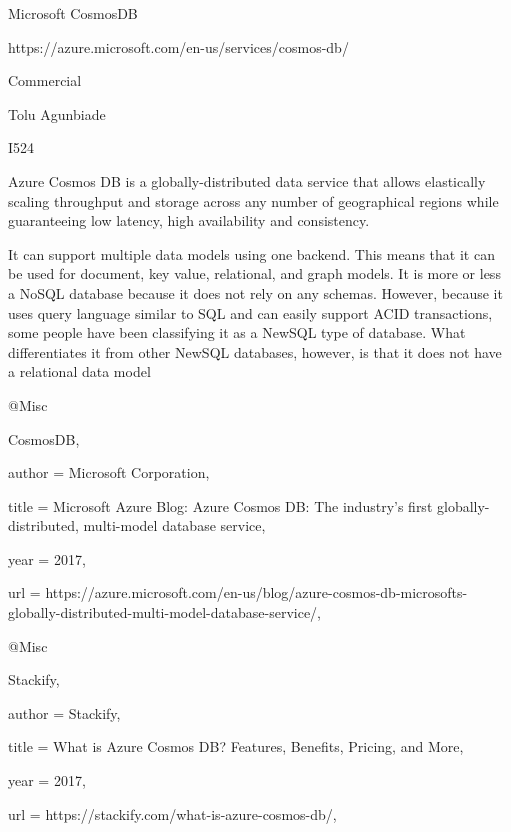 Microsoft CosmosDB

https://azure.microsoft.com/en-us/services/cosmos-db/

Commercial

Tolu Agunbiade

I524

Azure Cosmos DB is a globally-distributed data service that allows elastically scaling throughput and storage across any number of geographical regions while guaranteeing low latency, high availability and consistency\cite{hid-sp18-501-CosmosDB}.

It can support multiple data models using one backend. This means that it can be used for document, key value, relational, and graph models. It is more or less a NoSQL database because it does not rely on any schemas. However, because it uses query language similar to SQL and can easily support ACID transactions, some people have been classifying it as a NewSQL type of database. What differentiates it from other NewSQL databases, however, is that it does not have a relational data model\cite{hid-sp18-501-Stackify}

@Misc{CosmosDB,

  author = {Microsoft Corporation},

  title  = {Microsoft Azure Blog: Azure Cosmos DB: The industry’s first globally-distributed, multi-model database service},

  year   = {2017},

  url    = {https://azure.microsoft.com/en-us/blog/azure-cosmos-db-microsofts-globally-distributed-multi-model-database-service/},

}

@Misc{Stackify,

  author = {Stackify},

  title  = {What is Azure Cosmos DB? Features, Benefits, Pricing, and More},

  year   = {2017},

url = {https://stackify.com/what-is-azure-cosmos-db/},

}
